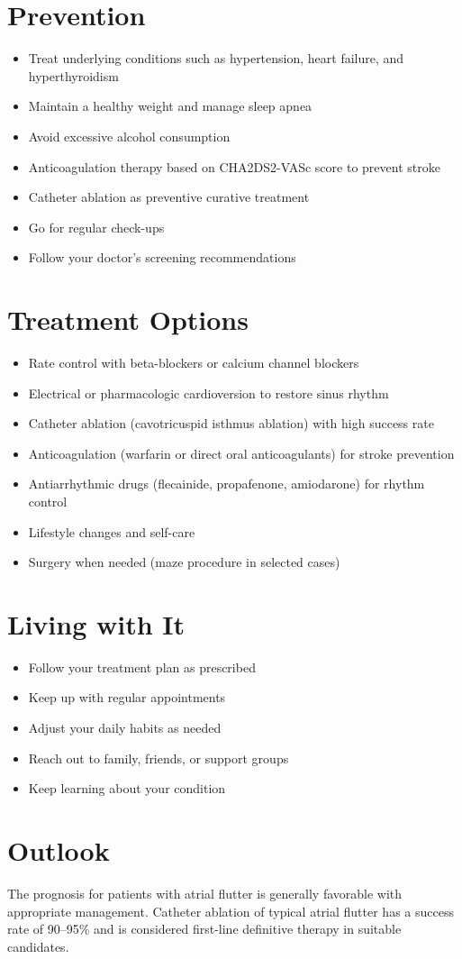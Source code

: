 \section{Prevention}

\begin{itemize}[noitemsep]
  \item Treat underlying conditions such as hypertension, heart failure, and hyperthyroidism
  \item Maintain a healthy weight and manage sleep apnea
  \item Avoid excessive alcohol consumption
  \item Anticoagulation therapy based on CHA2DS2-VASc score to prevent stroke
  \item Catheter ablation as preventive curative treatment
  \item Go for regular check-ups
  \item Follow your doctor's screening recommendations
\end{itemize}

\section{Treatment Options}

\begin{itemize}[noitemsep]
  \item Rate control with beta-blockers or calcium channel blockers
  \item Electrical or pharmacologic cardioversion to restore sinus rhythm
  \item Catheter ablation (cavotricuspid isthmus ablation) with high success rate
  \item Anticoagulation (warfarin or direct oral anticoagulants) for stroke prevention
  \item Antiarrhythmic drugs (flecainide, propafenone, amiodarone) for rhythm control
  \item Lifestyle changes and self-care
  \item Surgery when needed (maze procedure in selected cases)
\end{itemize}

\section{Living with It}

\begin{itemize}[noitemsep]
  \item Follow your treatment plan as prescribed
  \item Keep up with regular appointments
  \item Adjust your daily habits as needed
  \item Reach out to family, friends, or support groups
  \item Keep learning about your condition
\end{itemize}

\section{Outlook}
The prognosis for patients with atrial flutter is generally favorable with appropriate management. Catheter ablation of typical atrial flutter has a success rate of 90--95\% and is considered first-line definitive therapy in suitable candidates.
